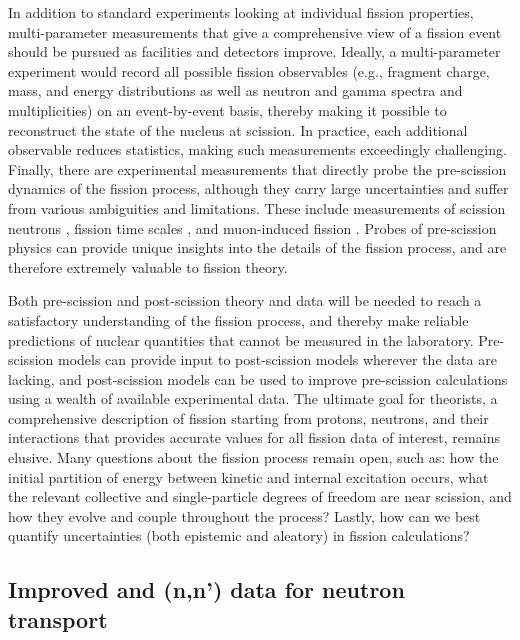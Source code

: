 \documentclass[letterpaper]{ar-1col}
\begin{document}
In addition to standard experiments looking at individual fission properties, multi-parameter measurements that give a comprehensive view of a fission event should be pursued as facilities and detectors improve. Ideally, a multi-parameter experiment would record all possible fission observables (e.g., fragment charge, mass, and energy distributions as well as neutron and gamma spectra and multiplicities) on an event-by-event basis, thereby making it possible to reconstruct the state of the nucleus at scission. In practice, each additional observable reduces statistics, making such measurements exceedingly challenging. Finally, there are experimental measurements that directly probe the pre-scission dynamics of the fission process, although they carry large uncertainties and suffer from various ambiguities and limitations. These include measurements of scission neutrons \cite{Petrov2009}, fission time scales \cite{Jac09}, and muon-induced fission \cite{Mar80}. Probes of pre-scission physics can provide unique insights into the details of the fission process, and are therefore extremely valuable to fission theory.

Both pre-scission and post-scission theory and data will be needed to reach a satisfactory understanding of the fission process, and thereby make reliable predictions of nuclear quantities that cannot be measured in the laboratory. Pre-scission models can provide input to post-scission models wherever the data are lacking, and post-scission models can be used to improve pre-scission calculations using a wealth of available experimental data. The ultimate goal for theorists, a comprehensive description of fission starting from protons, neutrons, and their interactions that provides accurate values for all fission data of interest, remains elusive.  Many questions about the fission process remain open, such as: how the initial partition of energy between kinetic and internal excitation occurs, what the relevant collective and single-particle degrees of freedom are near scission, and how they evolve and couple throughout the process? Lastly, how can we best quantify uncertainties (both epistemic and aleatory) in fission calculations?

\subsection{Improved \texorpdfstring{}{235,238U} and \texorpdfstring{}{239Pu}(n,n') data for neutron transport}\label{sec:n_transport}
\end{document}

